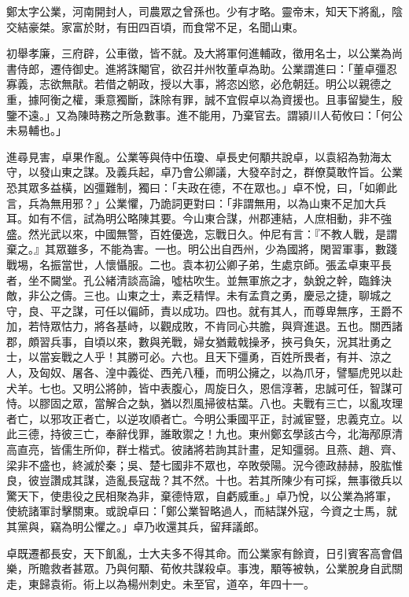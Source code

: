 
\begin{pinyinscope}
鄭太字公業，河南開封人，司農眾之曾孫也。少有才略。靈帝末，知天下將亂，陰交結豪桀。家富於財，有田四百頃，而食常不足，名聞山東。

初舉孝廉，三府辟，公車徵，皆不就。及大將軍何進輔政，徵用名士，以公業為尚書侍郎，遷侍御史。進將誅閹官，欲召并州牧董卓為助。公業謂進曰：「董卓彊忍寡義，志欲無猒。若借之朝政，授以大事，將恣凶慾，必危朝廷。明公以親德之重，據阿衡之權，秉意獨斷，誅除有罪，誠不宜假卓以為資援也。且事留變生，殷鑒不遠。」又為陳時務之所急數事。進不能用，乃棄官去。謂潁川人荀攸曰：「何公未易輔也。」

進尋見害，卓果作亂。公業等與侍中伍瓊、卓長史何顒共說卓，以袁紹為勃海太守，以發山東之謀。及義兵起，卓乃會公卿議，大發卒討之，群僚莫敢忤旨。公業恐其眾多益橫，凶彊難制，獨曰：「夫政在德，不在眾也。」卓不悅，曰，「如卿此言，兵為無用邪？」公業懼，乃詭詞更對曰：「非謂無用，以為山東不足加大兵耳。如有不信，試為明公略陳其要。今山東合謀，州郡連結，人庶相動，非不強盛。然光武以來，中國無警，百姓優逸，忘戰日久。仲尼有言：『不教人戰，是謂棄之。』其眾雖多，不能為害。一也。明公出自西州，少為國將，閑習軍事，數踐戰埸，名振當世，人懷懾服。二也。袁本初公卿子弟，生處京師。張孟卓東平長者，坐不闚堂。孔公緒清談高論，噓枯吹生。並無軍旅之才，埶銳之幹，臨鋒決敵，非公之儔。三也。山東之士，素乏精悍。未有孟賁之勇，慶忌之捷，聊城之守，良、平之謀，可任以偏師，責以成功。四也。就有其人，而尊卑無序，王爵不加，若恃眾怙力，將各基峙，以觀成敗，不肯同心共膽，與齊進退。五也。關西諸郡，頗習兵事，自頃以來，數與羌戰，婦女猶戴戟操矛，挾弓負矢，況其壯勇之士，以當妄戰之人乎！其勝可必。六也。且天下彊勇，百姓所畏者，有并、涼之人，及匈奴、屠各、湟中義從、西羌八種，而明公擁之，以為爪牙，譬驅虎兕以赴犬羊。七也。又明公將帥，皆中表腹心，周旋日久，恩信淳著，忠誠可任，智謀可恃。以膠固之眾，當解合之埶，猶以烈風掃彼枯葉。八也。夫戰有三亡，以亂攻理者亡，以邪攻正者亡，以逆攻順者亡。今明公秉國平正，討滅宦豎，忠義克立。以此三德，持彼三亡，奉辭伐罪，誰敢禦之！九也。東州鄭玄學該古今，北海邴原清高直亮，皆儒生所仰，群士楷式。彼諸將若詢其計畫，足知彊弱。且燕、趙、齊、梁非不盛也，終滅於秦；吳、楚七國非不眾也，卒敗滎陽。況今德政赫赫，股肱惟良，彼豈讚成其謀，造亂長寇哉？其不然。十也。若其所陳少有可採，無事徵兵以驚天下，使患役之民相聚為非，棄德恃眾，自虧威重。」卓乃悅，以公業為將軍，使統諸軍討擊關東。或說卓曰：「鄭公業智略過人，而結謀外寇，今資之士馬，就其黨與，竊為明公懼之。」卓乃收還其兵，留拜議郎。

卓既遷都長安，天下飢亂，士大夫多不得其命。而公業家有餘資，日引賓客高會倡樂，所贍救者甚眾。乃與何顒、荀攸共謀殺卓。事洩，顒等被執，公業脫身自武關走，東歸袁術。術上以為楊州刺史。未至官，道卒，年四十一。


\end{pinyinscope}
